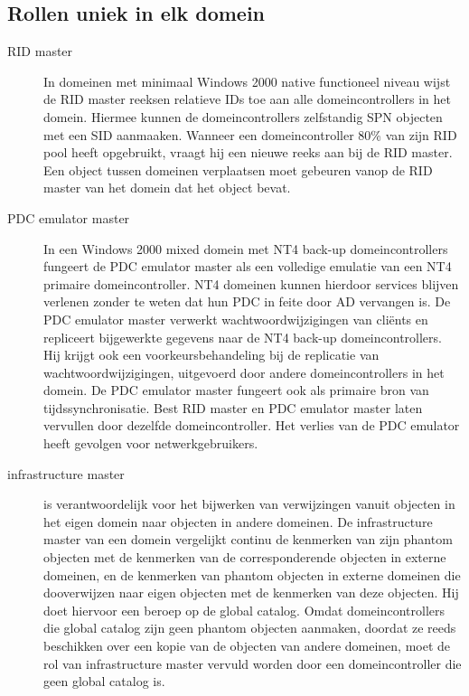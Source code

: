 \subsection{Rollen uniek in elk domein}
\begin{description}
	\item[RID master] In domeinen met minimaal Windows 2000 native
		functioneel niveau wijst de RID master reeksen relatieve IDs
		toe aan alle domeincontrollers in het domein. Hiermee kunnen de
		domeincontrollers zelfstandig SPN objecten met een SID
		aanmaaken. Wanneer een domeincontroller 80\% van zijn RID pool
		heeft opgebruikt, vraagt hij een nieuwe reeks aan bij de RID
		master.
		Een object tussen domeinen verplaatsen moet gebeuren vanop de
		RID master van het domein dat het object bevat.
	\item[PDC emulator master] In een Windows 2000 mixed domein met NT4
		back-up domeincontrollers fungeert de PDC emulator master als
		een volledige emulatie van een NT4 primaire domeincontroller.
		NT4 domeinen kunnen hierdoor services blijven verlenen zonder te
		weten dat hun PDC in feite door AD vervangen is. De PDC emulator
		master verwerkt wachtwoordwijzigingen van cliënts en repliceert
		bijgewerkte gegevens naar de NT4 back-up domeincontrollers. Hij
		krijgt ook een voorkeursbehandeling bij de replicatie van
		wachtwoordwijzigingen, uitgevoerd door andere domeincontrollers
		in het domein.
		De PDC emulator master fungeert ook als primaire bron van
		tijdssynchronisatie. Best RID master en PDC emulator master
		laten vervullen door dezelfde domeincontroller. Het verlies van
		de PDC emulator heeft gevolgen voor netwerkgebruikers.
	\item[infrastructure master] is verantwoordelijk voor het bijwerken van
		verwijzingen vanuit objecten in het eigen domein naar objecten
		in andere domeinen. De infrastructure master van een domein
		vergelijkt continu de kenmerken van zijn phantom objecten met de
		kenmerken van de corresponderende objecten in externe domeinen,
		en de kenmerken van phantom objecten in externe domeinen die
		dooverwijzen naar eigen objecten met de kenmerken van deze
		objecten. Hij doet hiervoor een beroep op de global catalog.
		Omdat domeincontrollers die global catalog zijn geen phantom
		objecten aanmaken, doordat ze reeds beschikken over een kopie
		van de objecten van andere domeinen, moet de rol van
		infrastructure master vervuld worden door een domeincontroller
		die geen global catalog is.
\end{description}

